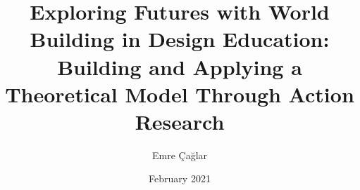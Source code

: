 \documentclass[chaparabic,id,phd,12pt,oneandhalf,fivejury]{metu}
\author{Emre Çağlar}
\title{Exploring Futures with World Building in Design Education: Building and Applying a Theoretical Model Through Action Research}
\date{February 2021}
\begin{document}
\begin{preliminaries}


\end{preliminaries}
%   
% 
%
\setlength{\parindent}{0em}
\setlength{\parskip}{10pt}







\appendices






\end{document}
